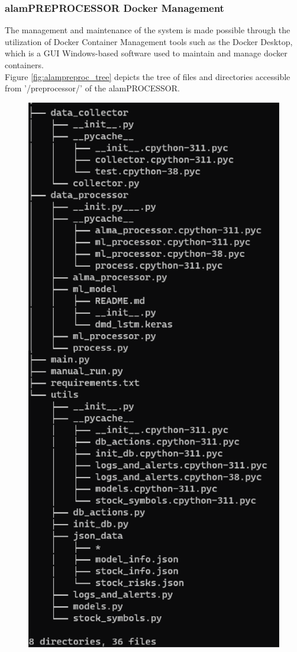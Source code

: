 \subsubsection{alamPREPROCESSOR Docker Management}
\label{subsubsec:alamPREPROCESSOR_docker_management}
The management and maintenance of the system is made possible
through the utilization of Docker Container Management tools
such as the Docker Desktop, which is a GUI Windows-based software
used to maintain and manage docker containers.
\\

Figure \ref{fig:alampreproc_tree} depicts the tree of files and directories accessible 
from '/preprocessor/' of the alamPROCESSOR.
\begin{figure}[ht]
    \centering
    \includegraphics[height=0.85\textheight]{./assets/Chapter_4/Documentation/alampre_tree.png}

\end{figure}

